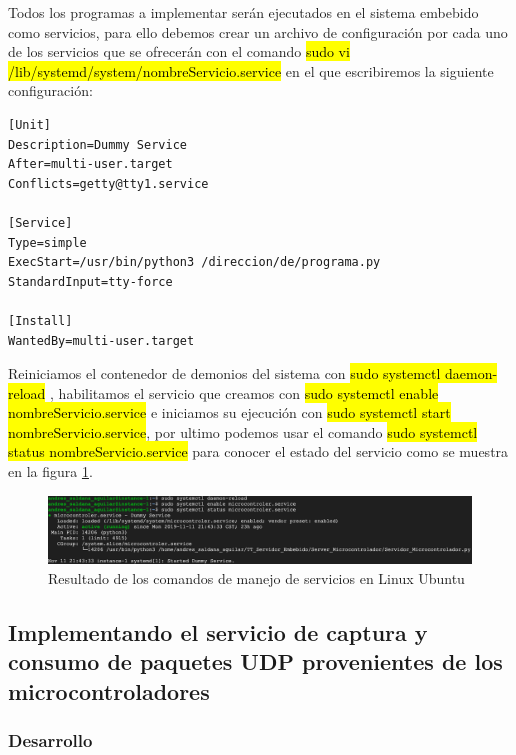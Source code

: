 Todos los programas a implementar serán ejecutados en el sistema embebido como servicios, para ello debemos crear un archivo de configuración por cada uno de los servicios que se ofrecerán con el comando \hl{sudo vi /lib/systemd/system/nombreServicio.service} en el que escribiremos la siguiente configuración:

\begin{lstlisting}
[Unit]
Description=Dummy Service
After=multi-user.target
Conflicts=getty@tty1.service

[Service]
Type=simple
ExecStart=/usr/bin/python3 /direccion/de/programa.py
StandardInput=tty-force

[Install]
WantedBy=multi-user.target
\end{lstlisting}

Reiniciamos el contenedor de demonios del sistema con \hl{sudo systemctl daemon-reload} , habilitamos el servicio que creamos con \hl{sudo systemctl enable nombreServicio.service} e iniciamos su ejecución con \hl{sudo systemctl start nombreServicio.service}, por ultimo podemos usar el comando \hl{sudo systemctl status nombreServicio.service} para conocer el estado del servicio como se muestra en la figura \ref{fig:systemctl}.

\begin{figure}[H]
	\centering
	\includegraphics[scale=.35]{Capitulo5/images/systemctl_tests.png}
	\caption{Resultado de los comandos de manejo de servicios en Linux Ubuntu}
	\label{fig:systemctl}
\end{figure} 

\subsection{Implementando el servicio de captura y consumo de paquetes UDP provenientes de los microcontroladores}

\subsubsection{Desarrollo}

